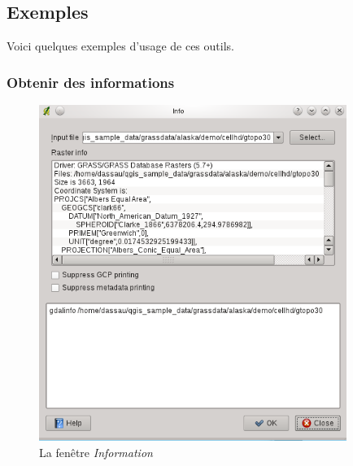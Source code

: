 {\subsection{Exemples}\label{gdal_examples}
Voici quelques exemples d'usage de ces outils.
\subsubsection{Obtenir des informations}
\begin{figure}[ht]
   \centering
   \caption{La fenêtre \emph{Information} \nixcaption}\label{gdalinfo}
   \includegraphics[clip=true, width=10cm]{plugins_gdaltools_images/gdalinfo}
\end{figure}

}
